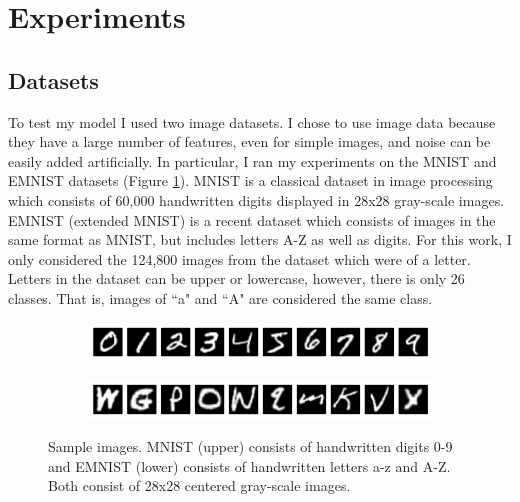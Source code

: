 \section{Experiments}
\subsection{Datasets}
To test my model I used two image datasets. I chose to use image data because they have a large number of features, even for simple images, and noise can be easily added artificially. In particular, I ran my experiments on the MNIST \cite{mnist} and EMNIST \cite{emnist} datasets (Figure \ref{fig:datasets}). MNIST is a classical dataset in image processing which consists of 60,000 handwritten digits displayed in 28x28 gray-scale images. EMNIST (extended MNIST) is a recent dataset which consists of images in the same format as MNIST, but includes letters A-Z as well as digits. For this work, I only considered the 124,800 images from the dataset which were of a letter. Letters in the dataset can be upper or lowercase, however, there is only 26 classes. That is, images of ``a" and ``A" are considered the same class.

\begin{figure}
	\centering
	\begin{subfigure}[b]{\textwidth}
		\includegraphics[width=\textwidth]{figs/mnist.png}
	\end{subfigure}
	\begin{subfigure}[b]{\textwidth}
		\includegraphics[width=\textwidth]{figs/emnist.png}
	\end{subfigure}
	\caption{Sample images. MNIST (upper) consists of handwritten digits 0-9 and EMNIST (lower) consists of handwritten letters a-z and A-Z. Both consist of 28x28 centered gray-scale images.}
	\label{fig:datasets}
\end{figure}


